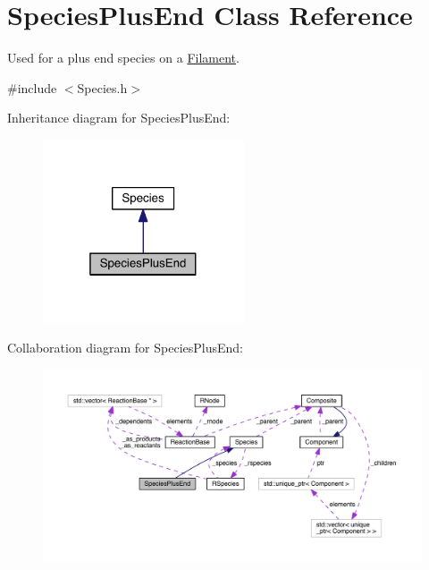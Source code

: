 \hypertarget{classSpeciesPlusEnd}{\section{Species\+Plus\+End Class Reference}
\label{classSpeciesPlusEnd}
}


Used for a plus end species on a \hyperlink{classFilament}{Filament}.  




{\ttfamily \#include $<$Species.\+h$>$}



Inheritance diagram for Species\+Plus\+End\+:\nopagebreak
\begin{figure}[H]
\begin{center}
\leavevmode
\includegraphics[width=169pt]{classSpeciesPlusEnd__inherit__graph}
\end{center}
\end{figure}


Collaboration diagram for Species\+Plus\+End\+:
\nopagebreak
\begin{figure}[H]
\begin{center}
\leavevmode
\includegraphics[width=350pt]{classSpeciesPlusEnd__coll__graph}
\end{center}
\end{figure}
